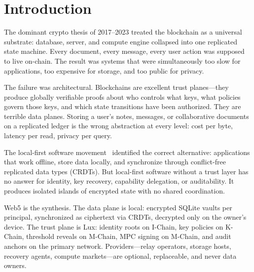 

\section{Introduction}
\label{sec:intro}

The dominant crypto thesis of 2017--2023 treated the blockchain as a universal
substrate: database, server, and compute engine collapsed into one replicated
state machine. Every document, every message, every user action was supposed to
live on-chain. The result was systems that were simultaneously too slow for
applications, too expensive for storage, and too public for privacy.

The failure was architectural. Blockchains are excellent trust planes---they
produce globally verifiable proofs about who controls what keys, what policies
govern those keys, and which state transitions have been authorized. They are
terrible data planes. Storing a user's notes, messages, or collaborative documents
on a replicated ledger is the wrong abstraction at every level: cost per byte,
latency per read, privacy per query.

The local-first software movement~\cite{kleppmann2019} identified the correct
alternative: applications that work offline, store data locally, and synchronize
through conflict-free replicated data types (CRDTs). But local-first software
without a trust layer has no answer for identity, key recovery, capability
delegation, or auditability. It produces isolated islands of encrypted state
with no shared coordination.

Web5 is the synthesis. The data plane is local: encrypted SQLite vaults per
principal, synchronized as ciphertext via CRDTs, decrypted only on the owner's
device. The trust plane is Lux: identity roots on I-Chain, key policies on
K-Chain, threshold reveals on M-Chain, MPC signing on M-Chain, and audit anchors
on the primary network. Providers---relay operators, storage hosts, recovery
agents, compute markets---are optional, replaceable, and never data owners.

